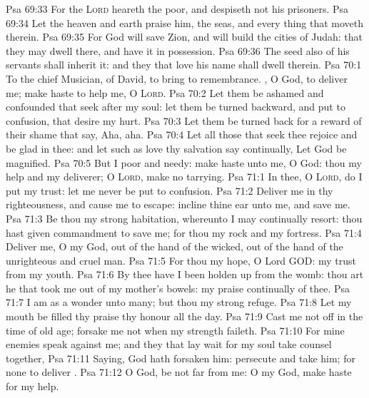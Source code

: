 \vs Psa 69:33 For the \textsc{Lord} heareth the poor, and despiseth not his prisoners.
\vs Psa 69:34 Let the heaven and earth praise him, the seas, and every thing that moveth therein.
\vs Psa 69:35 For God will save Zion, and will build the cities of Judah: that they may dwell there, and have it in possession.
\vs Psa 69:36 The seed also of his servants shall inherit it: and they that love his name shall dwell therein.
\vs Psa 70:1 To the chief Musician,  of David, to bring to remembrance. , O God, to deliver me; make haste to help me, O \textsc{Lord}.
\vs Psa 70:2 Let them be ashamed and confounded that seek after my soul: let them be turned backward, and put to confusion, that desire my hurt.
\vs Psa 70:3 Let them be turned back for a reward of their shame that say, Aha, aha.
\vs Psa 70:4 Let all those that seek thee rejoice and be glad in thee: and let such as love thy salvation say continually, Let God be magnified.
\vs Psa 70:5 But I  poor and needy: make haste unto me, O God: thou  my help and my deliverer; O \textsc{Lord}, make no tarrying.
\vs Psa 71:1 In thee, O \textsc{Lord}, do I put my trust: let me never be put to confusion.
\vs Psa 71:2 Deliver me in thy righteousness, and cause me to escape: incline thine ear unto me, and save me.
\vs Psa 71:3 Be thou my strong habitation, whereunto I may continually resort: thou hast given commandment to save me; for thou  my rock and my fortress.
\vs Psa 71:4 Deliver me, O my God, out of the hand of the wicked, out of the hand of the unrighteous and cruel man.
\vs Psa 71:5 For thou  my hope, O Lord GOD:  my trust from my youth.
\vs Psa 71:6 By thee have I been holden up from the womb: thou art he that took me out of my mother's bowels: my praise  continually of thee.
\vs Psa 71:7 I am as a wonder unto many; but thou  my strong refuge.
\vs Psa 71:8 Let my mouth be filled  thy praise  thy honour all the day.
\vs Psa 71:9 Cast me not off in the time of old age; forsake me not when my strength faileth.
\vs Psa 71:10 For mine enemies speak against me; and they that lay wait for my soul take counsel together,
\vs Psa 71:11 Saying, God hath forsaken him: persecute and take him; for  none to deliver .
\vs Psa 71:12 O God, be not far from me: O my God, make haste for my help.
